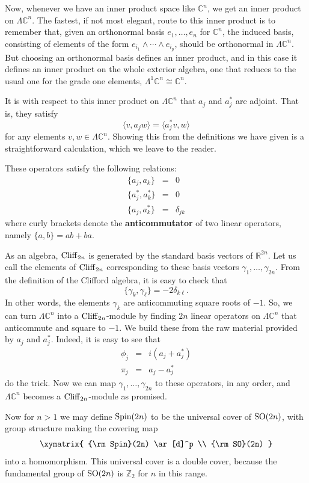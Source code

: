\documentclass{article}
\newcommand{\R}{{\mathbb R}}  %
\newcommand{\C}{{\mathbb C}}  %
\newcommand{\Z}{{\mathbb Z}}  %
\newcommand{\SO}{{\rm SO}}    %
\newcommand{\Spin}{{\rm Spin}}    %
\newcommand{\Ex}{\Lambda} %
\newcommand{\Cliff}{{\rm Cliff}}    %
\newcommand{\iso}{\cong} %
\begin{document}
Now, whenever we have an inner product space like $\C^n$, we get an inner
product on $\Ex \C^n$. The fastest, if not most elegant, route to this inner
product is to remember that, given an orthonormal basis $e_1, \ldots, e_n$ for
$\C^n$, the induced basis, consisting of elements of the form $e_{i_1} \wedge
\cdots \wedge e_{i_p}$, should be orthonormal in $\Ex \C^n$. But choosing an
orthonormal basis defines an inner product, and in this case it defines an
inner product on the whole exterior algebra, one that reduces to the usual one
for the grade one elements, $\Ex^1 \C^n \iso \C^n$.

It is with respect to this inner product on $\Ex \C^n$ that $a_j$ and $a_j^*$
are adjoint. That is, they satisfy
\[ \langle v, a_jw \rangle = \langle a_j^*v, w \rangle \]
for any elements $v,w \in \Ex \C^n$. Showing this from the definitions we have
given is a straightforward calculation, which we leave to the reader.

These operators satisfy the following relations:
\begin{eqnarray*} 
	\{ a_j, a_k \} & = & 0 \\
	\{ a_j^*, a_k^* \} & = & 0 \\
	\{ a_j, a_k^* \} & = & \delta_{jk}
\end{eqnarray*}
where curly brackets denote the \textbf{anticommutator} of two linear
operators, namely $\{a, b\} = ab + ba$.

As an algebra, $\Cliff_{2n}$ is generated by the standard basis vectors of
$\R^{2n}$.  Let us call the elements of $\Cliff_{2n}$ corresponding to these
basis vectors $\gamma_1, \ldots, \gamma_{2n}$.  From the definition of
the Clifford algebra, it is easy to check that
\[      \{   \gamma_k , \gamma_\ell \} = -2\delta_{k\ell}  .\]  
In other words, the elements
$\gamma_k$ are anticommuting square roots of $-1$.  So, we can turn 
$\Ex \C^n$ into a $\Cliff_{2n}$-module by finding $2n$ linear operators 
on $\Ex \C^n$ that anticommute and square to $-1$.  We build these from 
the raw material provided by $a_j$ and $a_j^*$.  Indeed, it is easy to
see that 
\begin{eqnarray*}
	\phi_j & = & i(a_j + a_j^*) \\
	\pi_j  & = & a_j - a_j^*
\end{eqnarray*}
do the trick.  Now we can map $\gamma_1, \ldots, \gamma_{2n}$ to these 
operators, in any order, and $\Ex \C^n$ becomes a $\Cliff_{2n}$-module as 
promised.  

Now for $n > 1$ we may define $\Spin(2n)$ to be the universal cover of 
$\SO(2n)$, with group structure making the covering map
\[
\xymatrix{
	\Spin(2n) \ar[d]^p \\
	\SO(2n)
}
\]
into a homomorphism.  This universal cover is a double cover, because
the fundamental group of $\SO(2n)$ is $\Z_2$ for $n$ in this range.
\end{document}
